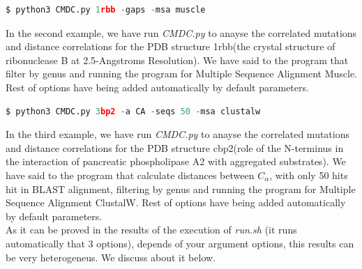 \documentclass[12pt]{article}
\begin{document}
\begin{lstlisting}[language=python]
$ python3 CMDC.py 1rbb -gaps -msa muscle
\end{lstlisting}
In the second example, we have run \textit{CMDC.py} to anayse the correlated mutations and distance correlations for the PDB structure 1rbb(the crystal structure of ribonuclease B at 2.5-Angstroms Resolution). We have said to the program that filter by genus and running the program for Multiple Sequence Alignment Muscle. Rest of options have being added automatically by default parameters.\\

\begin{lstlisting}[language=python]
$ python3 CMDC.py 3bp2 -a CA -seqs 50 -msa clustalw
\end{lstlisting}
In the third example, we have run \textit{CMDC.py} to anayse the correlated mutations and distance correlations for the PDB structure cbp2(role of the N-terminus in the interaction of pancreatic phospholipase A2 with aggregated substrates). We have said to the program that calculate distances between $C_{\alpha}$, with only 50 hits hit in BLAST alignment, filtering by genus and running the program for Multiple Sequence Alignment ClustalW. Rest of options have being added automatically by default parameters.\\

As it can be proved in the results of the execution of \textit{run.sh} (it runs automatically that 3 options), depends of your argument options, this results can be very heterogeneus. We discuss about it below.
\clearpage
\end{document}
